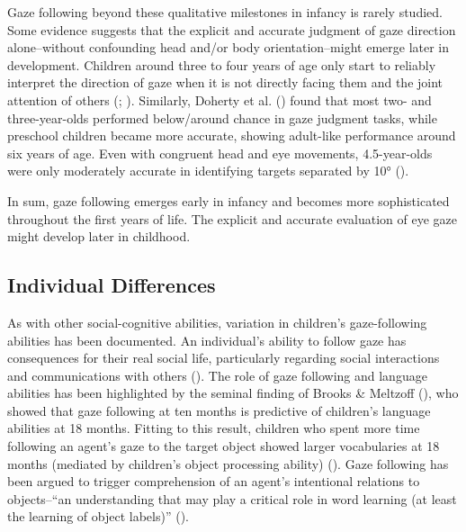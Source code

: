 \documentclass[
]{scrbook}
\begin{document}
Gaze following beyond these qualitative milestones in infancy is rarely studied. Some evidence suggests that the explicit and accurate judgment of gaze direction alone\thinspace --\thinspace without confounding head and/or body orientation\thinspace --\thinspace might emerge later in development. Children around three to four years of age only start to reliably interpret the direction of gaze when it is not directly facing them and the joint attention of others (; ). Similarly, Doherty et al. () found that most two- and three-year-olds performed below/around chance in gaze judgment tasks, while preschool children became more accurate, showing adult-like performance around six years of age. Even with congruent head and eye movements, 4.5-year-olds were only moderately accurate in identifying targets separated by 10° ().

In sum, gaze following emerges early in infancy and becomes more sophisticated throughout the first years of life. The explicit and accurate evaluation of eye gaze might develop later in childhood.

\subsection{Individual Differences}\label{individual-differences-1}

As with other social-cognitive abilities, variation in children's gaze-following abilities has been documented. An individual's ability to follow gaze has consequences for their real social life, particularly regarding social interactions and communications with others (). The role of gaze following and language abilities has been highlighted by the seminal finding of Brooks \& Meltzoff (), who showed that gaze following at ten months is predictive of children's language abilities at 18 months. Fitting to this result, children who spent more time following an agent's gaze to the target object showed larger vocabularies at 18 months (mediated by children's object processing ability) (). Gaze following has been argued to trigger comprehension of an agent's intentional relations to objects\thinspace --\thinspace ``an understanding that may play a critical role in word learning (at least the learning of object labels)'' ().
\end{document}
